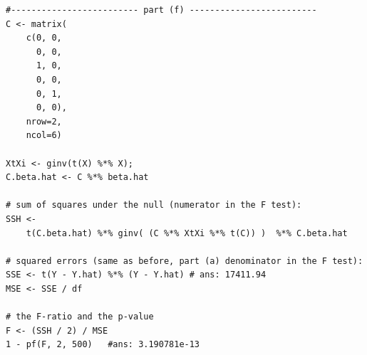 \documentclass[paper=a4, fontsize=11pt]{scrartcl} %
\begin{document}
\begin{lstlisting}[basicstyle=\ttfamily\small\bfseries]
#------------------------- part (f) -------------------------
C <- matrix( 
    c(0, 0, 
      0, 0, 
      1, 0,
      0, 0, 
      0, 1,
      0, 0),
    nrow=2, 
    ncol=6) 

XtXi <- ginv(t(X) %*% X); 
C.beta.hat <- C %*% beta.hat

# sum of squares under the null (numerator in the F test):
SSH <- 
    t(C.beta.hat) %*% ginv( (C %*% XtXi %*% t(C)) )  %*% C.beta.hat

# squared errors (same as before, part (a) denominator in the F test):
SSE <- t(Y - Y.hat) %*% (Y - Y.hat) # ans: 17411.94
MSE <- SSE / df

# the F-ratio and the p-value
F <- (SSH / 2) / MSE
1 - pf(F, 2, 500)   #ans: 3.190781e-13
\end{lstlisting}
\end{document}
